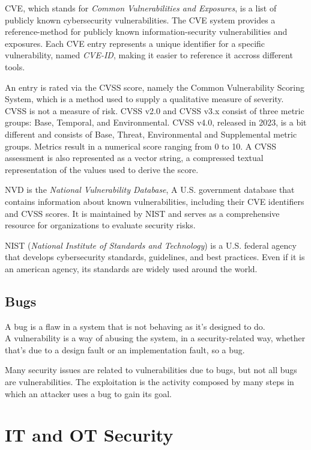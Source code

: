 CVE, which stands for \textit{Common Vulnerabilities and Exposures}, is a list of publicly known cybersecurity vulnerabilities. The CVE system provides a reference-method for publicly known information-security vulnerabilities and exposures. Each CVE entry represents a unique identifier for a specific vulnerability, named \textit{CVE-ID}, making it easier to reference it accross different tools. 

An entry is rated via the CVSS score, namely the Common Vulnerability Scoring System, which is a method used to supply a qualitative measure of severity. CVSS is not a measure of risk. CVSS v2.0 and CVSS v3.x consist of three metric groups: Base, Temporal, and Environmental. CVSS v4.0, released in 2023, is a bit different and consists of Base, Threat, Environmental and Supplemental metric groups. Metrics result in a numerical score ranging from 0 to 10. A CVSS assessment is also represented as a vector string, a compressed textual representation of the values used to derive the score.~\cite{cvss-metrics}


NVD is the \textit{National Vulnerability Database}, A U.S. government database that contains information about known vulnerabilities, including their CVE identifiers and CVSS scores. It is maintained by NIST and serves as a comprehensive resource for organizations to evaluate security risks.

NIST (\textit{National Institute of Standards and Technology}) is a U.S. federal agency that develops cybersecurity standards, guidelines, and best practices. Even if it is an american agency, its standards are widely used around the world.

\subsection{Bugs}

A bug is a flaw in a system that is not behaving as it's designed to do.\\
A vulnerability is a way of abusing the system, in a security-related way, whether that's due to a design fault or an implementation fault, so a bug.

Many security issues are related to vulnerabilities due to bugs, but not all bugs are vulnerabilities. The exploitation is the activity composed by many steps in which an attacker uses a bug to gain its goal.

\section{IT and OT Security}
 
